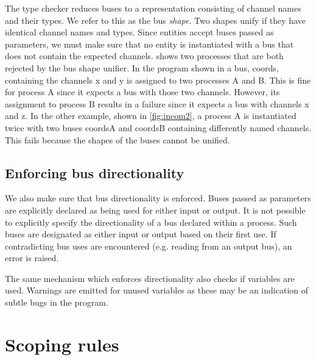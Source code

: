 The type checker reduces buses to a representation consisting of channel names
and their types. We refer to this as the bus {\itshape shape}. Two shapes unify if
they have identical channel names and types. Since entities accept buses passed
as parameters, we must make sure that no entity is instantiated with a bus that
does not contain the expected channels.  shows two processes
that are both rejected by the bus shape unifier. In the program shown in
 a bus, {\ttfamily coords}, containing the channels {\ttfamily x} and {\ttfamily
  y} is assigned to two processes {\ttfamily A} and {\ttfamily B}. This is fine for process
{\ttfamily A} since it expects a bus with those two channels. However, its assignment
to process {\ttfamily B} results in a failure since it expects a bus with channels
{\ttfamily x} and {\ttfamily z}. In the other example, shown in \cref{fig:incom2}, a process
{\ttfamily A} is instantiated twice with two buses {\ttfamily coordsA} and {\ttfamily coordsB}
containing differently named channels. This fails because the shapes of the
buses cannot be unified.


\subsection{Enforcing bus directionality}
We also make sure that bus directionality is enforced. Buses passed as
parameters are explicitly declared as being used for either input or output. It
is not possible to explicitly specify the directionality of a bus declared
within a process. Such buses are designated as either input or output based on
their first use. If contradicting bus uses are encountered (e.g. reading from an
output bus), an error is raised.

The same mechanism which enforces directionality also checks if variables are
used. Warnings are emitted for unused variables as these may be an indication of
subtle bugs in the program.

\section{Scoping rules}

